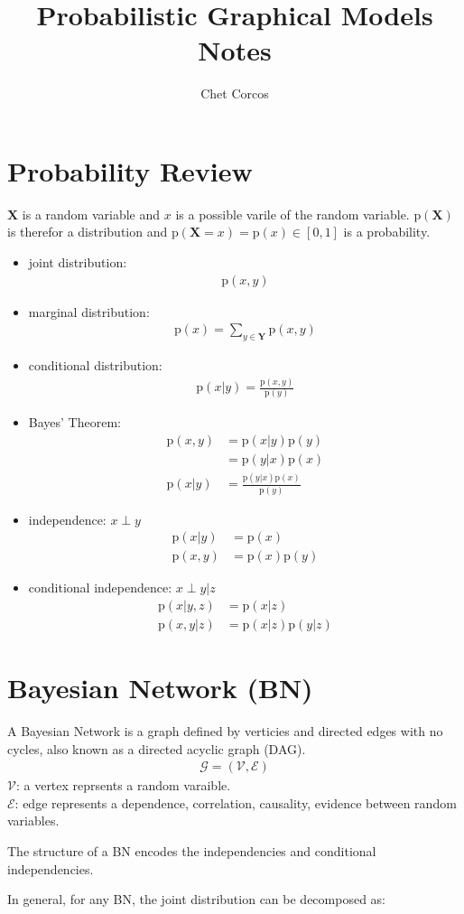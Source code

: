 \documentclass[11pt]{article}
\title{Probabilistic Graphical Models Notes}
\author{Chet Corcos}
\newcommand{\SetOf}[1]{\mathbf{#1}} %
\newcommand{\prob}[1]{\text{p}(#1)} %
\newcommand{\Eq}[1]{\begin{align*}#1\end{align*}} %
\newcommand{\cursive}[1]{\mathcal{#1}}
\begin{document}
\maketitle
\tableofcontents

\newpage

\section{Probability Review}

	$\SetOf{X}$ is a random variable and $x$ is a possible varile of the random variable. $\prob{\SetOf{X}}$ is therefor a distribution and $\prob{\SetOf{X}=x} = \prob{x} \in [0,1]$ is a probability.

	\begin{itemize}
		\item joint distribution: \Eq{\prob{x,y}}
		\item marginal distribution: \Eq{\prob{x} = \sum_{y \in \SetOf{Y}} \prob{x,y}}
		\item conditional distribution: \Eq{\prob{x|y} = \frac{\prob{x,y}}{\prob{y}}}
		\item Bayes' Theorem: \Eq{\prob{x,y} &= \prob{x|y}\prob{y} \\&= \prob{y|x} \prob{x}\\ \prob{x|y} &= \frac{\prob{y|x}\prob{x}}{\prob{y}}}
		\item independence: $x \perp y$ \Eq{\prob{x|y} &= \prob{x}\\\prob{x,y} &= \prob{x}\prob{y}}
		\item conditional independence: $x \perp y | z$ \Eq{\prob{x|y,z} &= \prob{x|z}\\\prob{x,y|z} &= \prob{x|z}\prob{y|z}}
	\end{itemize}

\section{Bayesian Network (BN)}
	A Bayesian Network is a graph defined by verticies and directed edges with no cycles, also known as a directed acyclic graph (DAG).
	\Eq{\cursive{G}=(\cursive{V},\cursive{E})} 
	$\cursive{V}$: a vertex reprsents a random varaible.\\ 
	$\cursive{E}$: edge represents a dependence, correlation, causality, evidence between random variables.

	The structure of a BN encodes the independencies and conditional independencies. 

	In general, for any BN, the joint distribution can be decomposed as:
\end{document}
